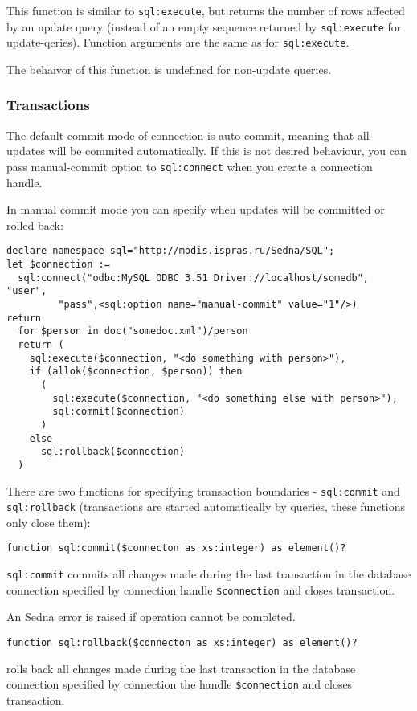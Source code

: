 \documentclass[a4paper,12pt]{article}
\begin{document}
This function is similar to \verb!sql:execute!, but returns the number
of rows affected by an update query (instead of an empty sequence returned by
\verb!sql:execute! for update-qeries). Function arguments are the same as for \verb!sql:execute!.

The behaivor of this function is undefined for non-update queries.

\subsubsection*{Transactions}

The default commit mode of connection is auto-commit, meaning that all updates
will be commited automatically. If this is not desired behaviour, you can
pass manual-commit option to \verb!sql:connect! when you create a connection
handle.

In manual commit mode you can specify when updates will be committed or rolled
back:

\small{
\begin{verbatim}
declare namespace sql="http://modis.ispras.ru/Sedna/SQL";
let $connection :=
  sql:connect("odbc:MySQL ODBC 3.51 Driver://localhost/somedb", "user",
         "pass",<sql:option name="manual-commit" value="1"/>)
return
  for $person in doc("somedoc.xml")/person
  return (
    sql:execute($connection, "<do something with person>"),
    if (allok($connection, $person)) then
      (
        sql:execute($connection, "<do something else with person>"),
        sql:commit($connection)
      )
    else
      sql:rollback($connection)
  )
\end{verbatim}
}

There are two functions for specifying transaction boundaries -
\verb!sql:commit! and \verb!sql:rollback! (transactions are started
automatically by queries, these functions only close them):
\begin{verbatim}
function sql:commit($connecton as xs:integer) as element()?
\end{verbatim}

\verb!sql:commit! commits all changes made during the last transaction in the database
connection specified by connection handle \verb!$connection!
and closes transaction.

An Sedna error is raised if operation cannot be completed.


\begin{verbatim}
function sql:rollback($connecton as xs:integer) as element()?
\end{verbatim}
rolls back all changes made during the last transaction in the database
connection specified by connection the handle \verb!$connection!
and closes transaction.
\end{document}
